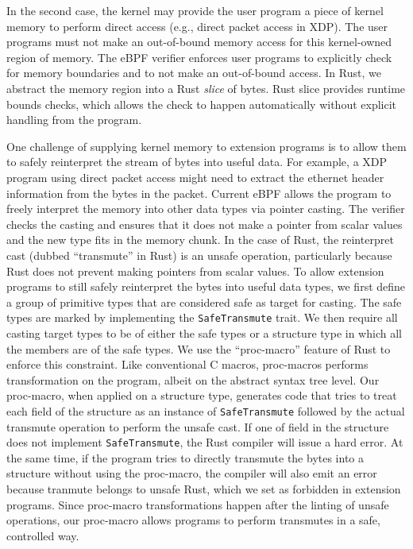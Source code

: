 In the second case, the kernel may provide the user program a piece of kernel
    memory to perform direct access (e.g., direct packet access in XDP).
The user programs must not make an out-of-bound memory access for this
    kernel-owned region of memory.
The eBPF verifier enforces user programs to explicitly check for memory
    boundaries and to not make an out-of-bound access.
In Rust, we abstract the memory region into a Rust \textit{slice} of bytes.
Rust slice provides runtime bounds checks, which allows the check to happen
    automatically without explicit handling from the program.

One challenge of supplying kernel memory to extension programs is to allow them
    to safely reinterpret the stream of bytes into useful data.
For example, a XDP program using direct packet access might need to extract
    the ethernet header information from the bytes in the packet.
Current eBPF allows the program to freely interpret the memory into other
    data types via pointer casting.
The verifier checks the casting and ensures that it does not make a pointer
    from scalar values and the new type fits in the memory chunk.
In the case of Rust, the reinterpret cast (dubbed ``transmute'' in Rust) is an
    unsafe operation, particularly because Rust does not prevent making
    pointers from scalar values.
To allow extension programs to still safely reinterpret the bytes into useful
    data types, we first define a group of primitive types that are considered
    safe as target for casting.
The safe types are marked by implementing the \texttt{SafeTransmute} trait.
We then require all casting target types to be of either the safe types or a
    structure type in which all the members are of the safe types.
We use the ``proc-macro'' feature of Rust to enforce this constraint.
Like conventional C macros, proc-macros performs transformation on the program,
    albeit on the abstract syntax tree level.
Our proc-macro, when applied on a structure type, generates code that tries
    to treat each field of the structure as an instance of
    \texttt{SafeTransmute} followed by the actual transmute operation to
    perform the unsafe cast.
If one of field in the structure does not implement \texttt{SafeTransmute},
    the Rust compiler will issue a hard error.
At the same time, if the program tries to directly transmute the bytes into a
    structure without using the proc-macro, the compiler will also emit an
    error because tranmute belongs to unsafe Rust, which we set as forbidden
    in extension programs.
Since proc-macro transformations happen after the linting of unsafe operations,
    our proc-macro allows programs to perform transmutes in a safe, controlled
    way.

